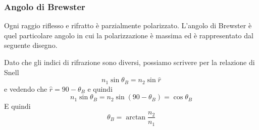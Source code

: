 \subsubsection{Angolo di Brewster}
Ogni raggio riflesso e rifratto è parzialmente polarizzato. L'angolo di Brewster è quel particolare
angolo in cui la polarizzazione è massima ed è rappresentato dal seguente disegno.
\begin{center}
\end{center}
Dato che gli indici di rifrazione sono diversi, possiamo scrivere per la relazione di Snell
\begin{equation*}
  n_1\sin\theta_B = n_2\sin\hat{r}
\end{equation*}
e vedendo che $\hat{r} = 90-\theta_B$ e quindi
\begin{equation*}
  n_1\sin\theta_B = n_2\sin(90-\theta_B) = \cos\theta_B
\end{equation*}
E quindi
\begin{equation*}
  \theta_B = \arctan\frac{n_2}{n_1}
\end{equation*}
